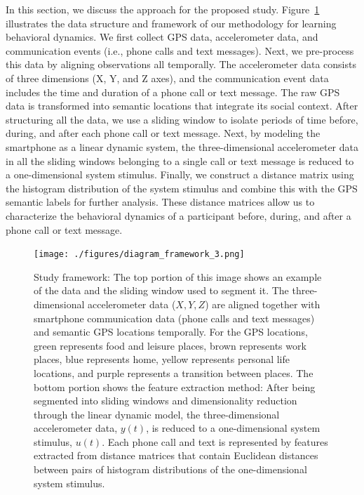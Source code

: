 \label{approach}
In this section, we discuss the approach for the proposed study.  Figure~\ref{fig:diagram} illustrates the data structure and framework of our methodology for learning behavioral dynamics.  We first collect GPS data, accelerometer data, and communication events (i.e., phone calls and text messages). Next, we pre-process this data by aligning observations all temporally.  The accelerometer data consists of three dimensions (X, Y, and Z axes), and the communication event data includes the time and duration of a phone call or text message. The raw GPS data is transformed into semantic locations that integrate its social context. After structuring all the data, we use a sliding window to isolate periods of time before, during, and after each phone call or text message.  Next, by modeling the smartphone as a linear dynamic system, the three-dimensional accelerometer data in all the sliding windows belonging to a single call or text message is reduced to a one-dimensional system stimulus. Finally, we construct a distance matrix using the histogram distribution of the system stimulus and combine this with the GPS semantic labels for further analysis.  These distance matrices allow us to characterize the behavioral dynamics of a participant before, during, and after a phone call or text message.


\begin{figure}[htbp!]
\centering
\texttt{[image: ./figures/diagram\_framework\_3.png]}
\caption{Study framework: The top portion of this image shows an example of the data and the sliding window used to segment it. The three-dimensional accelerometer data ($X,Y,Z$) are aligned together with smartphone communication data (phone calls and text messages) and semantic GPS locations temporally. For the GPS locations, green represents food and leisure places, brown represents work places, blue represents home, yellow represents personal life locations, and purple represents a transition between places. The bottom portion shows the feature extraction method: After being segmented into sliding windows and dimensionality reduction through the linear dynamic model, the three-dimensional accelerometer data, $y(t)$, is reduced to a one-dimensional system stimulus, $u(t)$. Each phone call and text is represented by features extracted from distance matrices that contain Euclidean distances between pairs of histogram distributions of the one-dimensional system stimulus.}
 \label{fig:diagram}
\end{figure}

